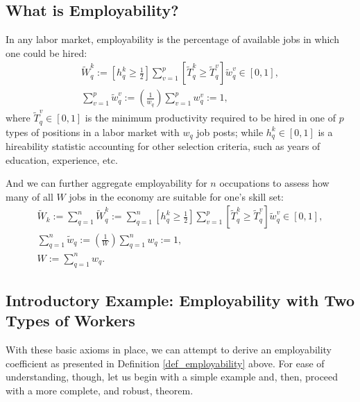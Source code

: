 \documentclass[hidelinks, nonatbib]{elsarticle}
\begin{document}
\subsection{What is Employability?}
\begin{definition}[Employability]
    \label{def_employability}
    In any labor market, employability is the percentage of available jobs in which one could be hired:
    \begin{gather}
    \tilde{W}_{q}^{k}
    :=
    \left[
        h_{q}^{k}
        \geq
        \frac{1}{2}
    \right]
    \sum_{v=1}^{p}
    \left[
        \tilde{T}_{q}^{k}
        \geq
        \tilde{T}_{q}^{v}
    \right]
    \tilde{w}_{q}^{v}
    \in
    [0,1]
    ,
    \\
    \sum_{v=1}^{p}
    \tilde{w}_{q}^{v}
    :=
    \left(
        \frac{1}{w_q}
    \right)
    \sum_{v=1}^{p}
    w_{q}^{v}
    := 1
    ,
    \end{gather}
    where $\tilde{T}_{q}^{v} \in [0,1]$ is the minimum productivity required to be hired in one of $p$ types of positions in a labor market with $w_q$ job posts; while $h_{q}^{k} \in [0,1]$ is a hireability statistic accounting for other selection criteria, such as years of education, experience, etc.
    
    And we can further aggregate employability for $n$ occupations to assess how many of all $W$ jobs in the economy are suitable for one's skill set:
    \begin{gather}
    \tilde{W}_{k}
    :=
    \sum_{q=1}^{n}
    \tilde{W}_{q}^{k}
    :=
    \sum_{q=1}^{n}
    \left[
        h_{q}^{k}
        \geq
        \frac{1}{2}
    \right]
    \sum_{v=1}^{p}
    \left[
        \tilde{T}_{q}^{k}
        \geq
        \tilde{T}_{q}^{v}
    \right]
    \tilde{w}_{q}^{v}
    \in
    [0,1]
    ,
    \\
    \sum_{q=1}^{n}
    \tilde{w}_{q}
    :=
    \left(
        \frac{1}{W}
    \right)
    \sum_{q=1}^{n}
    {w}_{q}
    :=
    1
    ,
    \\
    W
    :=
    \sum_{q=1}^{n}
    {w}_{q}
    .
    \end{gather}
\end{definition}

\subsection{Introductory Example: Employability with Two Types of Workers}
With these basic axioms in place, we can attempt to derive an employability coefficient as presented in Definition \ref{def_employability} above. For ease of understanding, though, let us begin with a simple example and, then, proceed with a more complete, and robust, theorem.
\end{document}

